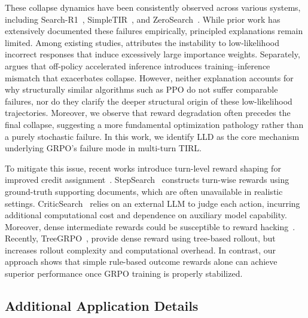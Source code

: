 These collapse dynamics have been consistently observed across various systems, including Search-R1~\citep{jin2025search}, SimpleTIR~\citep{xue2025simpletir}, and ZeroSearch~\citep{sun2025zerosearch}. While prior work has extensively documented these failures empirically, principled explanations remain limited. Among existing studies, \cite{xue2025simpletir} attributes the instability to low-likelihood incorrect responses that induce excessively large importance weights. Separately, \cite{liuspeed} argues that off-policy accelerated inference introduces training–inference mismatch that exacerbates collapse. However, neither explanation accounts for why structurally similar algorithms such as PPO do not suffer comparable failures, nor do they clarify the deeper structural origin of these low-likelihood trajectories. Moreover, we observe that reward degradation often precedes the final collapse, suggesting a more fundamental optimization pathology rather than a purely stochastic failure. In this work, we identify LLD as the core mechanism underlying GRPO’s failure mode in multi-turn TIRL.

To mitigate this issue, recent works introduce turn-level reward shaping for improved credit assignment~\cite{zheng2025stepsearch,zhang2025criticsearch,ji2025tree}. StepSearch~\cite{zheng2025stepsearch} constructs turn-wise rewards using ground-truth supporting documents, which are often unavailable in realistic settings. CriticSearch~\cite{zhang2025criticsearch} relies on an external LLM to judge each action, incurring additional computational cost and dependence on auxiliary model capability. Moreover, dense intermediate rewards could be susceptible to reward hacking~\cite{guo2025deepseek}. Recently, TreeGRPO~\cite{ji2025tree}, provide dense reward using tree-based rollout, but increases rollout complexity and computational overhead. In contrast, our approach shows that simple rule-based outcome rewards alone can achieve superior performance once GRPO training is properly stabilized.
 
\subsection{Additional Application Details}
